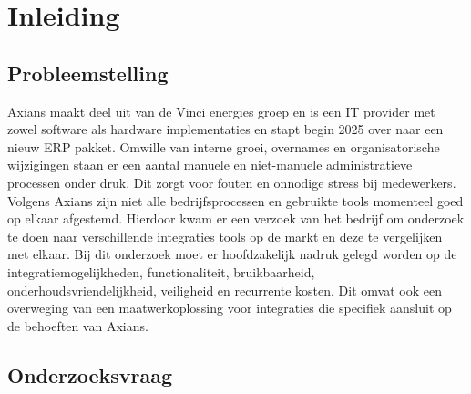


% 

\section{Inleiding}%
\label{sec:inleiding}

\subsection{Probleemstelling}
\label{sec:Probleemstelling}

Axians maakt deel uit van de Vinci energies groep en is een IT provider met zowel software als hardware implementaties en stapt begin 2025 over naar een nieuw ERP pakket. Omwille van interne groei, overnames en organisatorische wijzigingen staan er een aantal manuele en niet-manuele administratieve processen onder druk. Dit zorgt voor fouten en onnodige stress bij medewerkers. Volgens Axians zijn niet alle bedrijfsprocessen en gebruikte tools momenteel goed op elkaar afgestemd. Hierdoor kwam er een verzoek van het bedrijf om onderzoek te doen naar verschillende integraties tools op de markt en deze te vergelijken met elkaar. Bij dit onderzoek moet er hoofdzakelijk nadruk gelegd worden op de integratiemogelijkheden, functionaliteit, bruikbaarheid, onderhoudsvriendelijkheid, veiligheid en recurrente kosten. Dit omvat ook een overweging van een maatwerkoplossing voor integraties die specifiek aansluit op de behoeften van Axians.

\subsection{Onderzoeksvraag}
\label{sec:Onderzoeksvraag}

